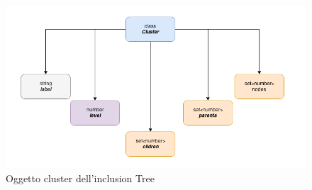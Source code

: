 {\begin{figure}[!htb]
	\begin{center}
		\includegraphics[width=1 \linewidth]{figure/clusterClass}
	\end{center}
	\caption{Oggetto cluster dell'inclusion Tree\label{fig:clusterClass}}
\end{figure}

}
